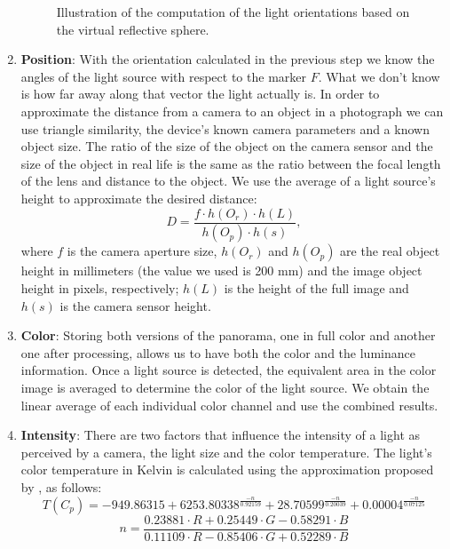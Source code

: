 \begin{enumerate}
\begin{figure}[H]
\begin{picture}
    \end{picture}
    \caption{Illustration of the computation of the light orientations based on the virtual reflective sphere.}
    \label{camMov}
\end{figure} 
\item \textbf{Position}: With the orientation calculated in the previous step we know the angles of the light source with respect to the marker $F$. What we don't know is how far away along that vector the light actually is. In order to approximate the distance from a camera to an object in a photograph we can use triangle similarity, the device's known camera parameters and a known object size. The ratio of the size of the object on the camera sensor and the size of the object in real life is the same as the ratio between the focal length of the lens and distance to the object.
We use the average of a light source's height to approximate the desired distance:
\begin{equation}
   D = \frac{f \cdot h(O_r) \cdot h(L)}{h(O_p) \cdot h(s)},
\end{equation}
where $f$ is the camera aperture size, $h(O_r)$ and $h(O_p)$ are the real object height in millimeters (the value we used is 200 mm) and the image object height in pixels, respectively; $h(L)$ is the height of the full image and $h(s)$ is the camera sensor height.

\item \textbf{Color}: Storing both versions of the panorama, one in full color and another one after processing, allows us to have both the color and the luminance information. Once a light source is detected, the equivalent area in the color image is averaged to determine the color of the light source. We obtain the linear average of each individual color channel and use the combined results.
\item \textbf{Intensity}: There are two factors that influence the intensity of a light as perceived by a camera, the light size and the color temperature. The light's color temperature in Kelvin is calculated using the approximation proposed by \citep{mccamy1992}, as follows:
\begin{equation}
    T(C_p) = -949.86315 + 6253.80338 ^ {\frac{-n}{0.92159} } + 28.70599 ^{\frac{-n}{0.20039} } + 0.00004 ^ {\frac{-n}{0.07125} }
\end{equation}
\begin{equation}
n = {\frac{0.23881\cdot R + 0.25449\cdot G - 0.58291\cdot B}{0.11109\cdot R - 0.85406\cdot G + 0.52289\cdot B} }
\end{equation}


\end{enumerate}
